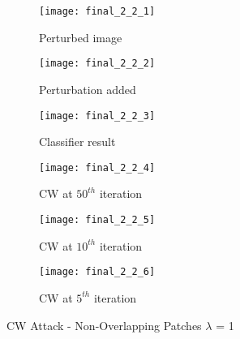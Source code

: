 \documentclass[11pt]{article}
\begin{document}
\begin{figure}[H]
\begin{subfigure}{.3\textwidth}
  \centering
  \texttt{[image: final\_2\_2\_1]}
  \caption{Perturbed image}
  \label{fig:}
\end{subfigure}
\begin{subfigure}{.3\textwidth}
  \centering
  \texttt{[image: final\_2\_2\_2]}
  \caption{Perturbation added}
  \label{fig:}
\end{subfigure}
\begin{subfigure}{.3\textwidth}
  \centering
  \texttt{[image: final\_2\_2\_3]}
  \caption{Classifier result}
  \label{fig:}
\end{subfigure}

\begin{subfigure}{.3\textwidth}
  \centering
  \texttt{[image: final\_2\_2\_4]}
  \caption{CW at $50^{th}$ iteration}
  \label{fig:}
\end{subfigure}
\begin{subfigure}{.3\textwidth}
  \centering
  \texttt{[image: final\_2\_2\_5]}
  \caption{CW at $10^{th}$ iteration}
  \label{fig:}
\end{subfigure}
\begin{subfigure}{.3\textwidth}
  \centering
  \texttt{[image: final\_2\_2\_6]}
  \caption{CW at $5^{th}$ iteration}
  \label{fig:}
\end{subfigure}

\caption{CW Attack - Non-Overlapping Patches $\lambda$ = 1}
\label{fig:}
\end{figure}
\end{document}
